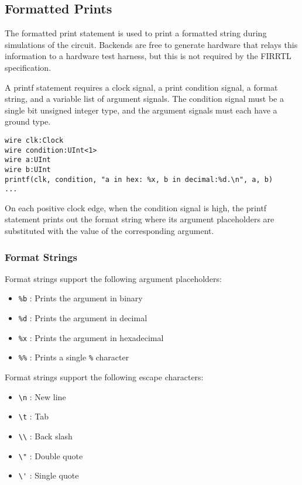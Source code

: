 \documentclass[12pt]{article}
\begin{document}
\subsection{Formatted Prints}
The formatted print statement is used to print a formatted string during simulations of the circuit. Backends are free to generate hardware that relays this information to a hardware test harness, but this is not required by the FIRRTL specification.

A printf statement requires a clock signal, a print condition signal, a format string, and a variable list of argument signals. The condition signal must be a single bit unsigned integer type, and the argument signals must each have a ground type.

\begin{lstlisting}
wire clk:Clock
wire condition:UInt<1>
wire a:UInt
wire b:UInt
printf(clk, condition, "a in hex: %x, b in decimal:%d.\n", a, b)
...
\end{lstlisting}

On each positive clock edge, when the condition signal is high, the printf statement prints out the format string where its argument placeholders are substituted with the value of the corresponding argument.

\subsubsection{Format Strings}

Format strings support the following argument placeholders:
\begin{itemize}
\item \verb|%b| : Prints the argument in binary
\item \verb|%d| : Prints the argument in decimal
\item \verb|%x| : Prints the argument in hexadecimal
\item \verb|%%| : Prints a single \verb|%| character
\end{itemize}

Format strings support the following escape characters:
\begin{itemize}
\item \verb|\n| : New line
\item \verb|\t| : Tab
\item \verb|\\| : Back slash
\item \verb|\"| : Double quote
\item \verb|\'| : Single quote
\end{itemize}
\end{document}
